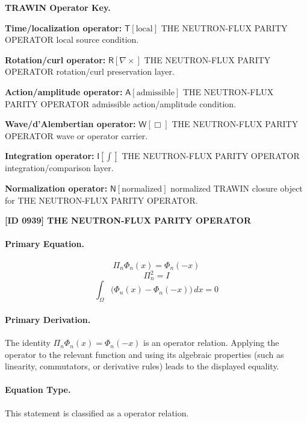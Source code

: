 \par\vspace{0.45\baselineskip}
\noindent\begin{minipage}[t]{\linewidth}
\begingroup
\small
\raggedright
\textbf{TRAWIN Operator Key.}\par
\noindent\textbf{Time/localization operator:} $\mathsf{T}\!\left[\mathrm{local}\right]$ THE NEUTRON-FLUX PARITY OPERATOR local source condition.\par
\noindent\textbf{Rotation/curl operator:} $\mathsf{R}\!\left[\nabla\times\right]$ THE NEUTRON-FLUX PARITY OPERATOR rotation/curl preservation layer.\par
\noindent\textbf{Action/amplitude operator:} $\mathsf{A}\!\left[\mathrm{admissible}\right]$ THE NEUTRON-FLUX PARITY OPERATOR admissible action/amplitude condition.\par
\noindent\textbf{Wave/d'Alembertian operator:} $\mathsf{W}\!\left[\Box\right]$ THE NEUTRON-FLUX PARITY OPERATOR wave or operator carrier.\par
\noindent\textbf{Integration operator:} $\mathsf{I}\!\left[\int\right]$ THE NEUTRON-FLUX PARITY OPERATOR integration/comparison layer.\par
\noindent\textbf{Normalization operator:} $\mathsf{N}\!\left[\mathrm{normalized}\right]$ normalized TRAWIN closure object for THE NEUTRON-FLUX PARITY OPERATOR.\par
\endgroup
\end{minipage}

\clearpage
\noindent\textbf{[ID 0939] THE NEUTRON-FLUX PARITY OPERATOR}\par
\vspace{0.35em}
\paragraph{Primary Equation.}
\[
\Pi_n\Phi_n(x)=\Phi_n(-x)
\]
\[
\Pi_n^2=I
\]
\[
\int_{\Omega}\bigl(\Phi_n(x)-\Phi_n(-x)\bigr)\,dx=0
\]

\paragraph{Primary Derivation.}
The identity \( \Pi_n\Phi_n(x)=\Phi_n(-x) \) is an operator relation. Applying the operator to the relevant function and using its algebraic properties (such as linearity, commutators, or derivative rules) leads to the displayed equality.
\paragraph{Equation Type.}
This statement is classified as a operator relation.

